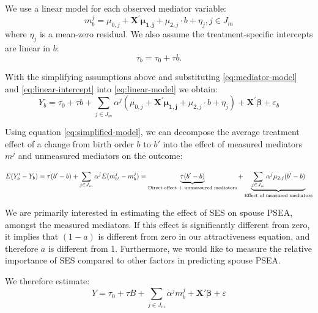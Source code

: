 \documentclass[
  12pt,
]{article}
\theoremstyle{definition}
\theoremstyle{definition}
\theoremstyle{definition}
\theoremstyle{definition}
\theoremstyle{remark}
\begin{document}
We use a linear model for each observed mediator variable:
\begin{equation}
\label{eq:mediator-model}
m^j_b=\mu_{0,j}+\mathbf{X^\prime}\symbf{\mu_{1,j}}+\mu_{2,j}\cdot b+\eta_j, j \in J_m  
\end{equation} where \(\eta_j\) is a mean-zero residual. We also assume
the treatment-specific intercepts are linear in \(b\): \begin{equation}
\label{eq:linear-intercept}
\tau_b=\tau_{0}+\tau b.  
\end{equation}

With the simplifying assumptions above and substituting
\eqref{eq:mediator-model} and \eqref{eq:linear-intercept} into
\eqref{eq:linear-model} we obtain: \begin{equation}
\label{eq:simplified-model}
Y_b = \tau_0+\tau b + \sum_{j \in J_m} \alpha^j (\mu_{0,j}+\mathbf{X^\prime}\symbf{\mu_{1,j}}+\mu_{2,j}\cdot b+\eta_j) + \mathbf{X^\prime} \symbf{\beta} + \varepsilon_b 
\end{equation}

Using equation \eqref{eq:simplified-model}, we can decompose the average
treatment effect of a change from birth order \(b\) to \(b'\) into the
effect of measured mediators \(m^j\) and unmeasured mediators on the
outcome:

\begin{equation}
\label{eq:decomposition}
E(Y_b' - Y_b) = \tau(b' - b) + \sum_{j \in J_m} \alpha^j E(m^j_{b'} - m^j_b) \\
=\underbrace{\tau(b' - b)}_{\text{Direct effect + unmeasured mediators}} + \underbrace{\sum_{j \in J_m} \alpha^j \mu_{2,j} (b' - b)}_{\text{Effect of measured mediators}}
\end{equation}

We are primarily interested in estimating the effect of SES on spouse
PSEA, amongst the measured mediators. If this effect is significantly
different from zero, it implies that \((1−a)\) is different from zero in
our attractiveness equation, and therefore \(a\) is different from 1.
Furthermore, we would like to measure the relative importance of SES
compared to other factors in predicting spouse PSEA.

We therefore estimate: \begin{equation}
\label{eq:model-to-estimate}
Y = \tau_0 + \tau B + \sum_{j \in J_m} \alpha^j m^j_b + \mathbf{X'} \symbf{\beta} + \varepsilon
\end{equation}
\end{document}
